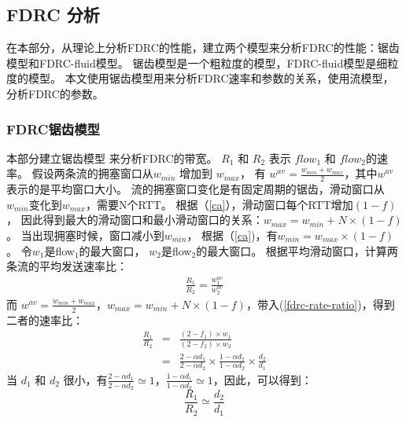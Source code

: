 \subsection{FDRC 分析}
在本部分，从理论上分析FDRC的性能，建立两个模型来分析FDRC的性能：锯齿模型和FDRC-fluid模型。
锯齿模型是一个粗粒度的模型，FDRC-fluid模型是细粒度的模型。
本文使用锯齿模型用来分析FDRC速率和参数的关系，使用流模型，分析FDRC的参数。

\subsubsection{FDRC锯齿模型}
本部分建立锯齿模型\cite{LPD} 来分析FDRC的带宽。
$R_{1}$ 和 $R_{2}$ 表示 $flow_1$ 和 $flow_2$的速率。
假设两条流的拥塞窗口从$w_{min}$ 增加到 $w_{max}$，
有 $w^{av}=\frac{w_{min}+w_{max}}{2}$，其中$w^{av}$表示的是平均窗口大小。
流的拥塞窗口变化是有固定周期的锯齿，滑动窗口从$w_{min}$变化到$w_{max}$，需要N个RTT。
根据（\ref{ca}），滑动窗口每个RTT增加$(1-f)$，
因此得到最大的滑动窗口和最小滑动窗口的关系：$w_{max}=w_{min}+N \times(1-f)$。
当出现拥塞时候，窗口减小到$w_{min}$，
根据（\ref{ca})，有$w_{min}=w_{max}\times(1-f)$。
令$w_{1}$是flow$_1$的最大窗口，
$w_{2}$是flow$_2$的最大窗口。
根据平均滑动窗口，计算两条流的平均发送速率比：
\begin{eqnarray}\label{fdrc-rate-ratio}
\frac{R_{1}}{R_{2}} =\frac{w^{av}_1}{w^{av}_2}
\end{eqnarray}
而 $w^{av}=\frac{w_{min}+w_{max}}{2}$，$w_{max}=w_{min}+N \times(1-f)$，带入(\ref{fdrc-rate-ratio})，得到二者的速率比：
\begin{eqnarray}\label{fdrc-rate-ratio2}
\frac{R_{1}}{R_{2}} &=&\frac{(2-f_1)\times w_1}{(2-f_2)\times w_2}  \nonumber \\
&=& \frac{2-\alpha d_1}{2-\alpha d_2}\times \frac{1-\alpha d_1}{1-
\alpha d_2}\times \frac{d_2}{d_1}\nonumber
\end{eqnarray}
当 $d_1$ 和 $d_2$ 很小，有$ \frac{2-\alpha d_1}{2-\alpha d_2}\simeq 1$，$ \frac{1-\alpha d_1}{1-
\alpha d_2}\simeq 1$，因此，可以得到：
\begin{equation}
\label{Ratio}
\frac{R_1}{R_2} \simeq \frac{d_2}{d_1}
\end{equation}

